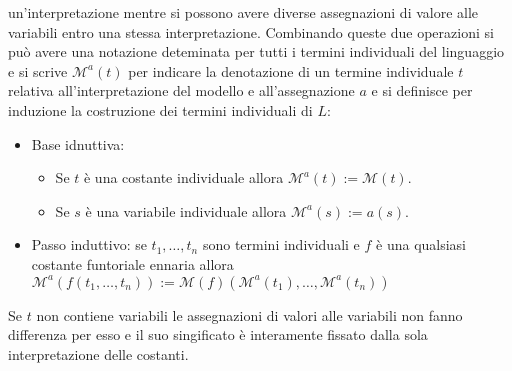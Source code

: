 un'interpretazione mentre si possono avere diverse assegnazioni di valore alle variabili entro una stessa interpretazione. Combinando queste due operazioni si pu\`o avere una notazione deteminata per tutti i 
termini individuali del linguaggio e si scrive $\mathcal{M}^a(t)$ per indicare la denotazione di un termine individuale $t$ relativa all'interpretazione del modello e all'assegnazione $a$ e si definisce per 
induzione la costruzione dei termini individuali di $L$:
\begin{itemize}
\item Base idnuttiva:
\begin{itemize}
\item Se $t$ \`e una costante individuale allora $\mathcal{M}^a(t):=\mathcal{M}(t)$.
\item Se $s$ \`e una variabile individuale allora $\mathcal{M}^a(s):=a(s)$.
\end{itemize}
\item Passo induttivo: se $t_1, \dots, t_n$ sono termini individuali e $f$ \`e una qualsiasi costante funtoriale ennaria allora $\mathcal{M}^a(f(t_1, \dots, t_n)):=\mathcal{M}(f)(\mathcal{M}^a(t_1), \dots, 
\mathcal{M}^a(t_n))$
\end{itemize}
Se $t$ non contiene variabili le assegnazioni di valori alle variabili non fanno differenza per esso e il suo singificato \`e interamente fissato dalla sola interpretazione delle costanti.
